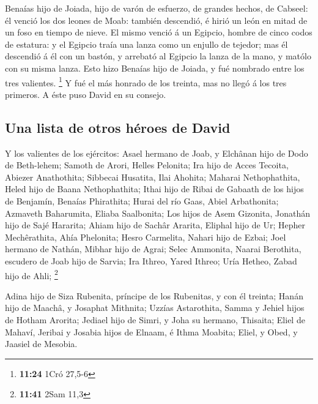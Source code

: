  Benaías hijo de Joiada, hijo de varón de esfuerzo, de
grandes hechos, de Cabseel: él venció los dos leones de Moab: también
descendió, é hirió un león en mitad de un foso en tiempo de nieve.
 El mismo venció á un Egipcio, hombre de cinco codos de
estatura: y el Egipcio traía una lanza como un enjullo de tejedor; mas
él descendió á él con un bastón, y arrebató al Egipcio la lanza de la
mano, y matólo con su misma lanza.  Esto hizo Benaías hijo
de Joiada, y fué nombrado entre los tres valientes. \footnote{\textbf{11:24}
  1Cró 27,5-6}  Y fué el más honrado de los treinta, mas no
llegó á los tres primeros. A éste puso David en su consejo.

\hypertarget{una-lista-de-otros-huxe9roes-de-david}{%
\subsection{Una lista de otros héroes de
David}\label{una-lista-de-otros-huxe9roes-de-david}}

 Y los valientes de los ejércitos: Asael hermano de Joab, y
Elchânan hijo de Dodo de Beth-lehem;  Samoth de Arori,
Helles Pelonita;  Ira hijo de Acces Tecoita, Abiezer
Anathothita;  Sibbecai Husatita, Ilai Ahohita;
 Maharai Nethophathita, Heled hijo de Baana Nethophathita;
 Ithai hijo de Ribai de Gabaath de los hijos de Benjamín,
Benaías Phirathita;  Hurai del río Gaas, Abiel Arbathonita;
 Azmaveth Baharumita, Eliaba Saalbonita;  Los
hijos de Asem Gizonita, Jonathán hijo de Sajé Hararita; 
Ahiam hijo de Sachâr Ararita, Eliphal hijo de Ur;  Hepher
Mechêrathita, Ahía Phelonita;  Hesro Carmelita, Nahari hijo
de Ezbai;  Joel hermano de Nathán, Mibhar hijo de Agrai;
 Selec Ammonita, Naarai Berothita, escudero de Joab hijo de
Sarvia;  Ira Ithreo, Yared Ithreo;  Uría
Hetheo, Zabad hijo de Ahli; \footnote{\textbf{11:41} 2Sam 11,3}

 Adina hijo de Siza Rubenita, príncipe de los Rubenitas, y
con él treinta;  Hanán hijo de Maachâ, y Josaphat Mithnita;
 Uzzías Astarothita, Samma y Jehiel hijos de Hotham
Arorita;  Jediael hijo de Simri, y Joha su hermano,
Thisaita;  Eliel de Mahaví, Jeribai y Josabia hijos de
Elnaam, é Ithma Moabita;  Eliel, y Obed, y Jaasiel de
Mesobia.


